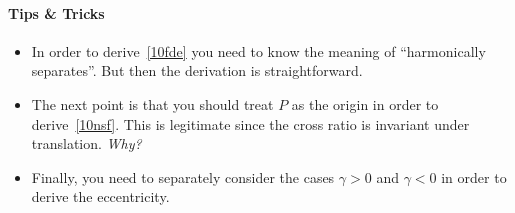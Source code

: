 \documentclass[11pt,a4paper]{report}
\theoremstyle{plain}
\theoremstyle{definition}
\begin{document}
\bigskip
\paragraph{Tips \& Tricks} 
\begin{itemize} [nosep]
\item In order to derive~\eqref{10fde} you need to know the meaning of ``harmonically separates''.  But then the derivation is straightforward.
\item The next point is that you should treat $ P $ as the origin in order to derive~\eqref{10nsf}.  This is legitimate since the cross ratio  is invariant under translation. \emph{Why?}
\item Finally, you need to separately consider the cases $ \gamma > 0 $ and  $ \gamma < 0 $ in order to derive the eccentricity.
\end{itemize} 
\end{document}
